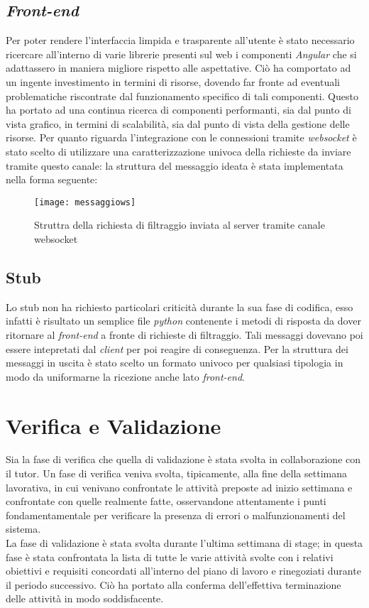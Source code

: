 \subsection{\textit{Front-end}}
Per poter rendere l'interfaccia limpida e trasparente all'utente è stato necessario ricercare all'interno di varie librerie presenti sul web i componenti \textit{Angular} che si adattassero in maniera migliore rispetto alle aspettative. Ciò ha comportato ad un ingente investimento in termini di risorse, dovendo far fronte ad eventuali problematiche riscontrate dal funzionamento specifico di tali componenti. Questo ha portato ad una continua ricerca di componenti performanti, sia dal punto di vista grafico, in termini di scalabilità, sia dal punto di vista della gestione delle risorse.
Per quanto riguarda l'integrazione con le connessioni tramite \textit{websocket} è stato scelto di utilizzare una caratterizzazione univoca della richieste da inviare tramite questo canale: la struttura del messaggio ideata è stata implementata nella forma seguente:
\begin{figure}[!h] 
	\centering 
	\texttt{[image: messaggiows]} 
	\caption{Struttra della richiesta di filtraggio inviata al server tramite canale websocket}
\end{figure}
\subsection{Stub}
Lo stub non ha richiesto particolari criticità durante la sua fase di codifica, esso infatti è risultato un semplice file \textit{python} contenente i metodi di risposta da dover ritornare al \textit{front-end} a fronte di richieste di filtraggio. Tali messaggi dovevano poi essere intepretati dal \textit{client} per poi reagire di conseguenza. Per la struttura dei messaggi in uscita è stato scelto un formato univoco per qualsiasi tipologia in modo da uniformarne la ricezione anche lato \textit{front-end}.
\newpage
\section{Verifica e Validazione}
Sia la fase di verifica che quella di validazione è stata svolta in collaborazione con il tutor. Un fase di verifica veniva svolta, tipicamente, alla fine della settimana lavorativa, in cui venivano confrontate le attività preposte ad inizio settimana e confrontate con quelle realmente fatte, osservandone attentamente i punti fondamentamentale per verificare la presenza di errori o malfunzionamenti del sistema.\\ La fase di validazione è stata svolta durante l'ultima settimana di stage; in questa fase è stata confrontata la lista di tutte le varie attività svolte con i relativi obiettivi e requisiti concordati all'interno del piano di lavoro e rinegoziati durante il periodo successivo. Ciò ha portato alla conferma dell'effettiva terminazione delle attività in modo soddisfacente. 

